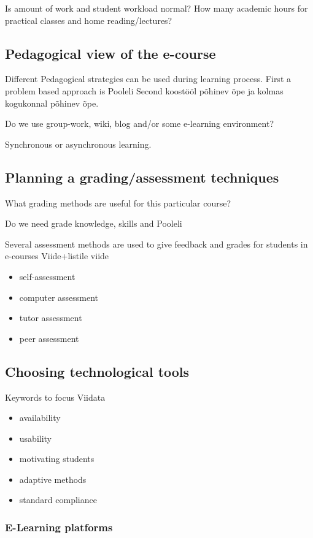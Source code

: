 Is amount of work and student workload normal? How many academic hours for practical classes and home reading/lectures?

\subsection{Pedagogical view of the e-course}
Different Pedagogical strategies can be used during learning process. First a problem based approach is {\color{red} Pooleli }
Second koostööl põhinev õpe ja kolmas kogukonnal põhinev õpe.

Do we use group-work, wiki, blog and/or some e-learning environment?

Synchronous or asynchronous learning.

\subsection{Planning a grading/assessment techniques}
What grading methods are useful for this particular course?

Do we need grade knowledge, skills and {\color{red} Pooleli }

Several assessment methods are used to give feedback and grades for students in e-courses {\color{red} Viide+listile viide }

\begin{itemize}
	\item self-assessment
	\item computer assessment
	\item tutor assessment
	\item peer assessment
\end{itemize}
\subsection{Choosing technological tools}
Keywords to focus {\color{red} Viidata }
\begin{itemize}
	\item availability
	\item usability 
	\item motivating students
	\item adaptive methods
	\item standard compliance
\end{itemize}
\subsubsection{E-Learning platforms}

